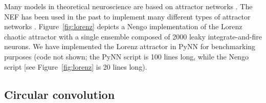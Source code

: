 \documentclass{frontiersSCNS}
\begin{document}
Many models in theoretical neuroscience
are based on attractor networks \citep{amit1992, deco2003}.
The NEF has been used in the past
to implement many different types of
attractor networks \citep{eliasmith2005}.
Figure~\ref{fig:lorenz} depicts
a Nengo implementation of the Lorenz chaotic attractor
with a single ensemble
composed of 2000 leaky integrate-and-fire neurons.
We have implemented the Lorenz attractor
in PyNN for benchmarking purposes
(code not shown; the PyNN script is 100 lines long,
while the Nengo script [see Figure~\ref{fig:lorenz}
is 20 lines long).

\subsection{Circular convolution} \label{sec:cconv}
\end{document}
